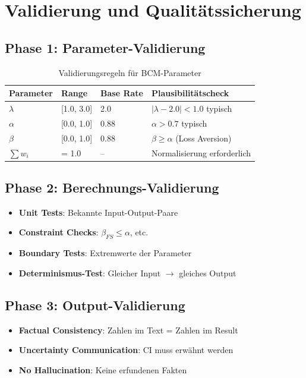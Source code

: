 \documentclass[12pt,a4paper]{article}
\begin{document}
\section{Validierung und Qualitätssicherung}

\subsection{Phase 1: Parameter-Validierung}

\begin{table}[h]
\centering
\caption{Validierungsregeln für BCM-Parameter}
\begin{tabular}{@{}llll@{}}
\toprule
\textbf{Parameter} & \textbf{Range} & \textbf{Base Rate} & \textbf{Plausibilitätscheck} \\
\midrule
$\lambda$ & [1.0, 3.0] & 2.0 & $|\lambda - 2.0| < 1.0$ typisch \\
$\alpha$ & [0.0, 1.0] & 0.88 & $\alpha > 0.7$ typisch \\
$\beta$ & [0.0, 1.0] & 0.88 & $\beta \geq \alpha$ (Loss Aversion) \\
$\sum w_i$ & = 1.0 & -- & Normalisierung erforderlich \\
\bottomrule
\end{tabular}
\end{table}

\subsection{Phase 2: Berechnungs-Validierung}

\begin{itemize}
    \item \textbf{Unit Tests}: Bekannte Input-Output-Paare
    \item \textbf{Constraint Checks}: $\beta_{FS} \leq \alpha$, etc.
    \item \textbf{Boundary Tests}: Extremwerte der Parameter
    \item \textbf{Determinismus-Test}: Gleicher Input $\rightarrow$ gleiches Output
\end{itemize}

\subsection{Phase 3: Output-Validierung}

\begin{itemize}
    \item \textbf{Factual Consistency}: Zahlen im Text = Zahlen im Result
    \item \textbf{Uncertainty Communication}: CI muss erwähnt werden
    \item \textbf{No Hallucination}: Keine erfundenen Fakten
\end{itemize}
\end{document}
